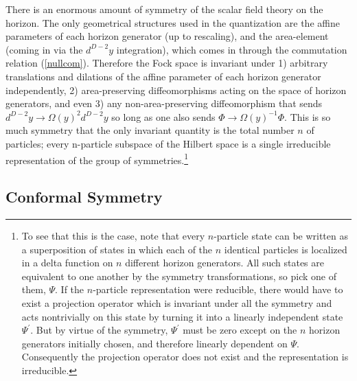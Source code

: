 \documentclass[12pt]{article}
\begin{document}
There is an enormous amount of symmetry of the scalar field theory on the horizon.  The only geometrical structures used in the quantization are the affine parameters of each horizon generator (up to rescaling), and the area-element (coming in via the $d^{D-2}y$ integration), which comes in through the commutation relation (\ref{nullcom}).  Therefore the Fock space is invariant under 1) arbitrary translations and dilations of the affine parameter of each horizon generator independently, 2) area-preserving diffeomorphisms acting on the space of horizon generators, and even 3) any non-area-preserving diffeomorphism that sends $d^{D-2}y \to \Omega(y)^2 d^{D-2}y$ so long as one also sends $\Phi \to \Omega(y)^{-1} \Phi$.  This is so much symmetry that the only invariant quantity is the total number $n$ of particles; every n-particle subspace of the Hilbert space is a single irreducible representation of the group of symmetries.\footnote{To see that this is the case, note that every $n$-particle state can be written as a superposition of states in which each of the $n$ identical particles is localized in a delta function on $n$ different horizon generators.  All such states are equivalent to one another by the symmetry transformations, so pick one of them, $\Psi$.  If the $n$-particle representation were reducible, there would have to exist a projection operator which is invariant under all the symmetry and acts nontrivially on this state by turning it into a linearly independent state $\Psi^\prime$.  But by virtue of the symmetry, $\Psi^\prime$ must be zero except on the $n$ horizon generators initially chosen, and therefore linearly dependent on $\Psi$.  Consequently the projection operator does not exist and the representation is irreducible.}

\subsection{Conformal Symmetry}\label{conf}
\end{document}
